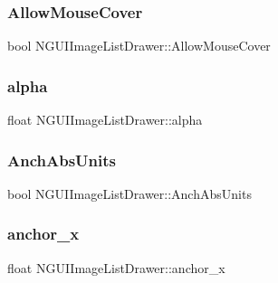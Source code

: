 \hypertarget{class_n_g_u_i_image_list_drawer_aae762ff03b27a2db3a8c36132d29a414}{}\label{class_n_g_u_i_image_list_drawer_aae762ff03b27a2db3a8c36132d29a414} 
\subsubsection{\texorpdfstring{Allow\+Mouse\+Cover}{AllowMouseCover}}
{\footnotesize\ttfamily bool N\+G\+U\+I\+Image\+List\+Drawer\+::\+Allow\+Mouse\+Cover}

\hypertarget{class_n_g_u_i_image_list_drawer_a12b8fae75eac21c660c9553440a26ba1}{}\label{class_n_g_u_i_image_list_drawer_a12b8fae75eac21c660c9553440a26ba1} 
\subsubsection{\texorpdfstring{alpha}{alpha}}
{\footnotesize\ttfamily float N\+G\+U\+I\+Image\+List\+Drawer\+::alpha}

\hypertarget{class_n_g_u_i_image_list_drawer_a6dc521c0eb7ee78f745932b71e409569}{}\label{class_n_g_u_i_image_list_drawer_a6dc521c0eb7ee78f745932b71e409569} 
\subsubsection{\texorpdfstring{Anch\+Abs\+Units}{AnchAbsUnits}}
{\footnotesize\ttfamily bool N\+G\+U\+I\+Image\+List\+Drawer\+::\+Anch\+Abs\+Units}

\hypertarget{class_n_g_u_i_image_list_drawer_a4eb127a9f2377b0c67ba6bcfeea02ced}{}\label{class_n_g_u_i_image_list_drawer_a4eb127a9f2377b0c67ba6bcfeea02ced} 
\subsubsection{\texorpdfstring{anchor\+\_\+x}{anchor\_x}}
{\footnotesize\ttfamily float N\+G\+U\+I\+Image\+List\+Drawer\+::anchor\+\_\+x}

